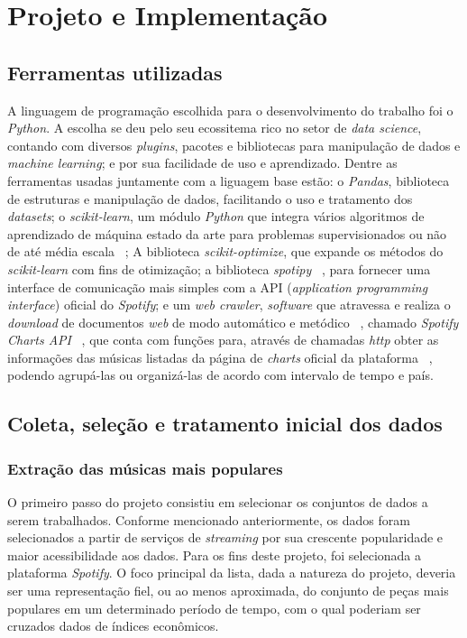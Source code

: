 \chapter{Projeto e Implementação}
\label{c.projeto}

\section{Ferramentas utilizadas}
\label{c.ferramentas}

A linguagem de programação escolhida para o desenvolvimento do trabalho foi o \textit{Python}. A escolha se deu pelo seu ecossitema rico no setor de \textit{data science}, contando com diversos \textit{plugins}, pacotes e bibliotecas para manipulação de dados e \textit{machine learning}; e por sua facilidade de uso e aprendizado. Dentre as ferramentas usadas juntamente com a liguagem base estão: o \textit{Pandas}, biblioteca de estruturas e manipulação de dados, facilitando o uso e tratamento dos \textit{datasets}; o \textit{scikit-learn}, um módulo \textit{Python} que integra vários algoritmos de aprendizado de máquina estado da arte para problemas supervisionados ou não de até média escala ~\cite{scikit-learn}; A biblioteca \textit{scikit-optimize}, que expande os métodos do \textit{scikit-learn} com fins de otimização; a biblioteca \textit{spotipy} ~\cite{spotipy}, para fornecer uma interface de comunicação mais simples com a API (\textit{application programming interface}) oficial do \textit{Spotify}; e um \textit{web crawler}, \textit{software} que atravessa e realiza o \textit{download} de documentos \textit{web} de modo automático e metódico ~\cite{webcrawler}, chamado \textit{Spotify Charts API} ~\cite{fycharts}, que conta com funções para, através de chamadas \textit{http} obter as informações das músicas listadas da página de \textit{charts} oficial da plataforma ~\cite{spotify_charts}, podendo agrupá-las ou organizá-las de acordo com intervalo de tempo e país.

\section{Coleta, seleção e tratamento inicial dos dados}
\label{c.coleta}

\subsection{Extração das músicas mais populares}
\label{c.extracao_popular}

O primeiro passo do projeto consistiu em selecionar os conjuntos de dados a serem trabalhados. Conforme mencionado anteriormente, os dados foram selecionados a partir de serviços de \textit{streaming} por sua crescente popularidade e maior acessibilidade aos dados. Para os fins deste projeto, foi selecionada a plataforma \textit{Spotify}. O foco principal da lista, dada a natureza do projeto, deveria ser uma representação fiel, ou ao menos aproximada, do conjunto de peças mais populares em um determinado período de tempo, com o qual poderiam ser cruzados dados de índices econômicos.

